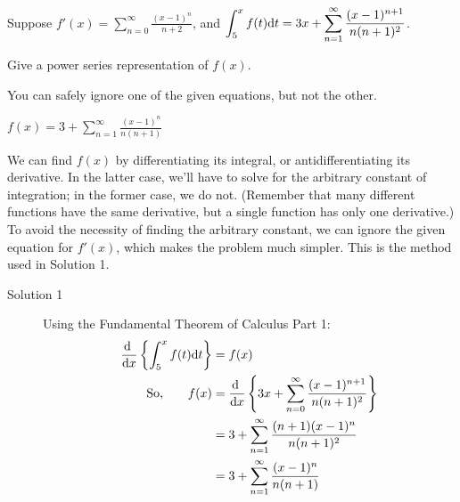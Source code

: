 \begin{Mquestion}
	Suppose $f'(x)=\displaystyle\sum_{n=0}^\infty \frac{(x-1)^{n}}{n+2}$, and
	$\displaystyle \int_5^x f(t)\mathrm{d}t=3x+\displaystyle\sum_{n=1}^\infty \frac{(x-1)^{n+1}}{n(n+1)^2}$.

	Give a power series representation of $f(x)$.
\end{Mquestion}
\begin{hint}
	You can safely ignore one of the given equations, but not the other.
\end{hint}
\begin{answer}
	$f(x)=3+\displaystyle\sum_{n=1}^\infty \frac{(x-1)^{n}}{n(n+1)}$
\end{answer}
\begin{solution}
	We can find $f(x)$ by differentiating its integral, or antidifferentiating its derivative. In the latter case, we'll have to solve for the arbitrary constant of integration; in the former case, we do not. (Remember that many different functions have the same derivative, but a single function has only one derivative.) To avoid the necessity of finding the arbitrary constant, we can ignore the given equation for $f'(x)$, which makes the problem much simpler. This is the method used in Solution 1.
	\begin{description}
		\item[Solution 1]
		Using the Fundamental Theorem of Calculus Part 1:
		\begin{align*}
		\diff{}{x} \left\{\int_5^x f(t)\dee{t} \right\}&=f(x)\\
		\text{So,}\qquad
		f(x)&=\diff{}{x} \left\{3x+\displaystyle\sum_{n=0}^\infty \frac{(x-1)^{n+1}}{n(n+1)^2}  \right\}\\
		&=3+\displaystyle\sum_{n=1}^\infty \frac{(n+1)(x-1)^{n}}{n(n+1)^2}\\
		&=3+\displaystyle\sum_{n=1}^\infty \frac{(x-1)^{n}}{n(n+1)}
		\end{align*}


\end{description}
\end{solution}
